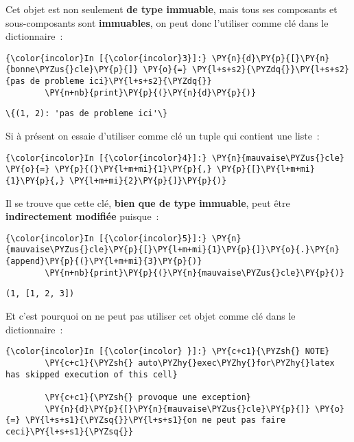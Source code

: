     Cet objet est non seulement \textbf{de type immuable}, mais tous ses
composants et sous-composants sont \textbf{immuables}, on peut donc
l'utiliser comme clé dans le dictionnaire~:

    \begin{Verbatim}[commandchars=\\\{\}]
{\color{incolor}In [{\color{incolor}3}]:} \PY{n}{d}\PY{p}{[}\PY{n}{bonne\PYZus{}cle}\PY{p}{]} \PY{o}{=} \PY{l+s+s2}{\PYZdq{}}\PY{l+s+s2}{pas de probleme ici}\PY{l+s+s2}{\PYZdq{}}
        \PY{n+nb}{print}\PY{p}{(}\PY{n}{d}\PY{p}{)}
\end{Verbatim}


    \begin{Verbatim}[commandchars=\\\{\}]
\{(1, 2): 'pas de probleme ici'\}

    \end{Verbatim}

    Si à présent on essaie d'utiliser comme clé un tuple qui contient une
liste~:

    \begin{Verbatim}[commandchars=\\\{\}]
{\color{incolor}In [{\color{incolor}4}]:} \PY{n}{mauvaise\PYZus{}cle} \PY{o}{=} \PY{p}{(}\PY{l+m+mi}{1}\PY{p}{,} \PY{p}{[}\PY{l+m+mi}{1}\PY{p}{,} \PY{l+m+mi}{2}\PY{p}{]}\PY{p}{)}
\end{Verbatim}


    Il se trouve que cette clé, \textbf{bien que de type immuable}, peut
être \textbf{indirectement modifiée} puisque~:

    \begin{Verbatim}[commandchars=\\\{\}]
{\color{incolor}In [{\color{incolor}5}]:} \PY{n}{mauvaise\PYZus{}cle}\PY{p}{[}\PY{l+m+mi}{1}\PY{p}{]}\PY{o}{.}\PY{n}{append}\PY{p}{(}\PY{l+m+mi}{3}\PY{p}{)}
        \PY{n+nb}{print}\PY{p}{(}\PY{n}{mauvaise\PYZus{}cle}\PY{p}{)}
\end{Verbatim}


    \begin{Verbatim}[commandchars=\\\{\}]
(1, [1, 2, 3])

    \end{Verbatim}

    Et c'est pourquoi on ne peut pas utiliser cet objet comme clé dans le
dictionnaire~:

    \begin{Verbatim}[commandchars=\\\{\}]
{\color{incolor}In [{\color{incolor} }]:} \PY{c+c1}{\PYZsh{} NOTE}
        \PY{c+c1}{\PYZsh{} auto\PYZhy{}exec\PYZhy{}for\PYZhy{}latex has skipped execution of this cell}
        
        \PY{c+c1}{\PYZsh{} provoque une exception}
        \PY{n}{d}\PY{p}{[}\PY{n}{mauvaise\PYZus{}cle}\PY{p}{]} \PY{o}{=} \PY{l+s+s1}{\PYZsq{}}\PY{l+s+s1}{on ne peut pas faire ceci}\PY{l+s+s1}{\PYZsq{}}
\end{Verbatim}


